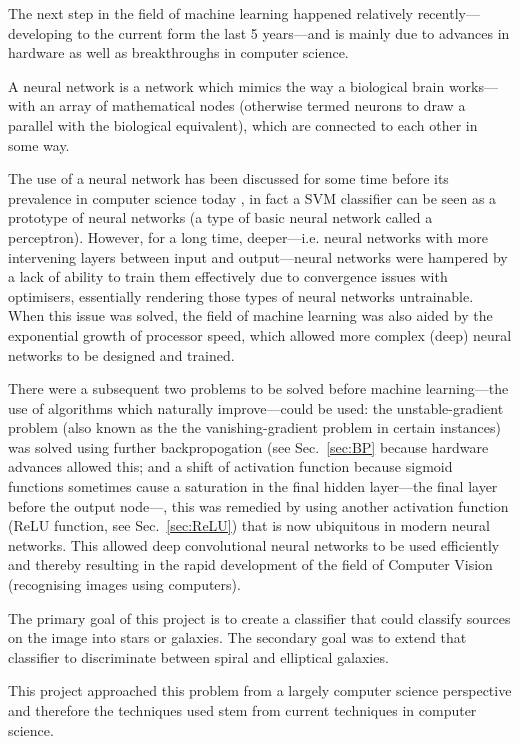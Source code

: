 \documentclass[a4paper,fleqn,usenatbib]{mnras}
\begin{document}
The next step in the field of machine learning happened relatively recently---developing to the current form the last 5 years---and is mainly due to advances in hardware as well as breakthroughs in computer science. 

A neural network is a network which mimics the way a biological brain works---with an array of mathematical nodes (otherwise termed neurons to draw a parallel with the biological equivalent), which are connected to each other in some way. 

The use of a neural network has been discussed for some time before its prevalence in computer science today \citep{History}, in fact a SVM classifier can be seen as a prototype of neural networks (a type of basic neural network called a perceptron). However, for a long time, deeper---i.e. neural networks with more intervening layers between input and output---neural networks were hampered by a lack of ability to train them effectively due to convergence issues with optimisers, essentially rendering those types of neural networks untrainable.\citep{History} When this issue was solved, the field of machine learning was also aided by the exponential growth of processor speed, which allowed more complex (deep) neural networks to be designed and trained.

There were a subsequent two problems to be solved before machine learning---the use of algorithms which naturally improve---could be used: the unstable-gradient problem (also known as the the vanishing-gradient problem in certain instances) was solved using further backpropogation (see Sec.~\ref{sec:BP} because hardware advances allowed this; and a shift of activation function because sigmoid functions sometimes cause a saturation in the final hidden layer---the final layer before the output node---\citep{ReLu}, this was remedied by using another activation function (ReLU function, see Sec.~\ref{sec:ReLU}) that is now ubiquitous in modern neural networks. This allowed deep convolutional neural networks to be used efficiently and thereby resulting in the rapid development of the field of Computer Vision (recognising images using computers). \citep{NeuralNetworksandDeepLearning}

The primary goal of this project is to create a classifier that could classify sources on the image into stars or galaxies. The secondary goal was to extend that classifier to discriminate between spiral and elliptical galaxies. 

This project approached this problem from a largely computer science perspective and therefore the techniques used stem from current techniques in computer science. 
\end{document}
